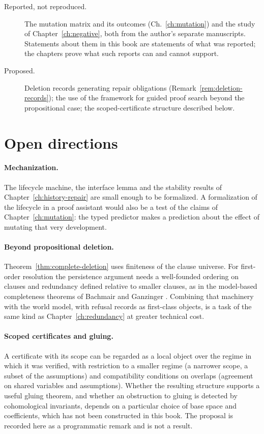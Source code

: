 \begin{description}
\item[Reported, not reproduced.] The mutation matrix and its outcomes (Ch.~\ref{ch:mutation}) and the study of Chapter~\ref{ch:negative}, both from the author's separate manuscripts. Statements about them in this book are statements of what was reported; the chapters prove what such reports can and cannot support.
\item[Proposed.] Deletion records generating repair obligations (Remark~\ref{rem:deletion-records}); the use of the framework for guided proof search beyond the propositional case; the scoped-certificate structure described below.
\end{description}

\section{Open directions}

\paragraph{Mechanization.} The lifecycle machine, the interface lemma and the stability results of Chapter~\ref{ch:history-repair} are small enough to be formalized. A formalization of the lifecycle in a proof assistant would also be a test of the claims of Chapter~\ref{ch:mutation}: the typed predictor makes a prediction about the effect of mutating that very development.

\paragraph{Beyond propositional deletion.} Theorem~\ref{thm:complete-deletion} uses finiteness of the clause universe. For first-order resolution the persistence argument needs a well-founded ordering on clauses and redundancy defined relative to smaller clauses, as in the model-based completeness theorems of Bachmair and Ganzinger \cite{bachmairganzinger1994}. Combining that machinery with the world model, with refusal records as first-class objects, is a task of the same kind as Chapter~\ref{ch:redundancy} at greater technical cost.

\paragraph{Scoped certificates and gluing.} A certificate with its scope can be regarded as a local object over the regime in which it was verified, with restriction to a smaller regime (a narrower scope, a subset of the assumptions) and compatibility conditions on overlaps (agreement on shared variables and assumptions). Whether the resulting structure supports a useful gluing theorem, and whether an obstruction to gluing is detected by cohomological invariants, depends on a particular choice of base space and coefficients, which has not been constructed in this book. The proposal is recorded here as a programmatic remark and is not a result.

